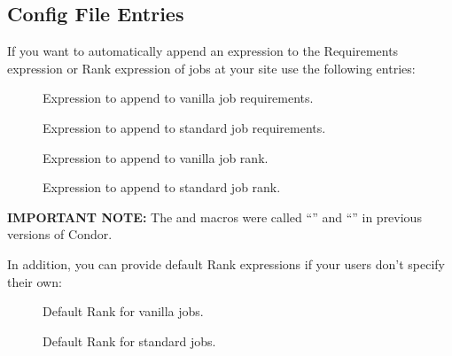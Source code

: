 \subsection{ Config File Entries}
\label{sec:Submit-Config-File-Entries}

If you want  to automatically append an expression to
the Requirements expression or Rank expression of jobs at your site
use the following entries:

\begin{description}
  
\item[] \label{param:AppendReqVanilla}
  Expression to append to vanilla job requirements.
  
\item[] \label{param:AppendReqStandard}
  Expression to append to standard job requirements.

\item[] \label{param:AppendRankStandard}
  Expression to append to vanilla job rank.

\item[] \label{param:AppendRankVanilla}
  Expression to append to standard job rank.

\end{description}

\textbf{IMPORTANT NOTE:} The  and 
 macros were called
``'' and
``'' in previous versions of Condor.

In addition, you can provide default Rank expressions if your users
don't specify their own:

\begin{description}

\item[] \label{param:DefaultRankVanilla}
  Default Rank for vanilla jobs.  

\item[] \label{param:DefaultRankStandard}
  Default Rank for standard jobs.

\end{description}

